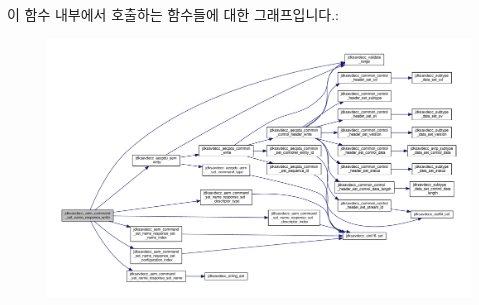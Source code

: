 이 함수 내부에서 호출하는 함수들에 대한 그래프입니다.\+:
\nopagebreak
\begin{figure}[H]
\begin{center}
\leavevmode
\includegraphics[width=350pt]{group__command__set__name__response_gac87ff2e29820e2a4150c4f205962cf67_cgraph}
\end{center}
\end{figure}



